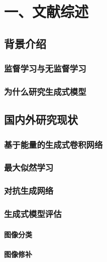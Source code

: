 
\chapter{一、文献综述}

\vspace{2em}

\section{背景介绍}



\subsection{监督学习与无监督学习}



\subsection{为什么研究生成式模型}



\section{国内外研究现状}

\subsection{基于能量的生成式卷积网络}


\subsection{最大似然学习}



\subsection{对抗生成网络}

\subsection{生成式模型评估}


\subsubsection{图像分类}

\subsubsection{图像修补}


